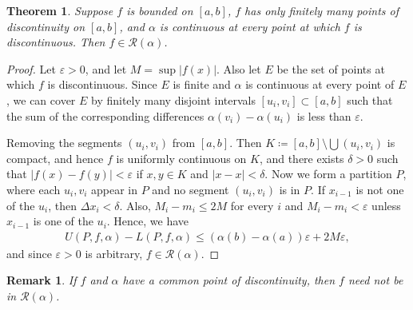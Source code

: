 \documentclass[11pt]{book}
\newtheorem{theorem}{Theorem}[chapter]
\newtheorem{remark}{Remark}[chapter]
\theoremstyle{definition}
\numberwithin{equation}{chapter}
\begin{document}
\begin{theorem}
Suppose $f$ is bounded on $[a,b]$, $f$ has only finitely many points of discontinuity on $[a,b]$, and $\alpha$ is continuous at every point at which $f$ is discontinuous. Then $f \in \mathscr{R}(\alpha)$.
\end{theorem}
\begin{proof}
Let $\varepsilon > 0$, and let $M = \sup \left|f(x)\right|$. Also let $E$ be the set of points at which $f$ is discontinuous. Since $E$ is finite and $\alpha$ is continuous at every point of $E$, we can cover $E$ by finitely many disjoint intervals $[u_i,v_i] \subset [a,b]$ such that the sum of the corresponding differences $\alpha(v_i) - \alpha(u_i)$ is less than $\varepsilon$. 

Removing the segments $(u_i,v_i)$ from $[a,b]$. Then $K \coloneqq [a,b] \setminus \bigcup (u_i,v_i)$ is compact, and hence $f$ is uniformly continuous on $K$, and there exists $\delta > 0$ such that $\left|f(x) - f(y)\right| < \varepsilon$ if $x,y \in K$ and $\left|x - x\right| < \delta$. Now we form a partition $P$, where each $u_i,v_i$ appear in $P$ and no segment $(u_i,v_i)$ is in $P$. If $x_{i-1}$ is not one of the $u_i$, then $\Delta x_i < \delta$. 
Also, $M_i - m_i \leq 2M$ for every $i$ and $M_i - m_i < \varepsilon$ unless $x_{i-1}$ is one of the $u_i$. Hence, we have
\begin{align*}
    U(P,f,\alpha) - L(P,f,\alpha) \leq \left(\alpha(b) - \alpha(a)\right) \varepsilon + 2M \varepsilon,
\end{align*}
and since $\varepsilon > 0$ is arbitrary, $f \in \mathscr{R}(\alpha)$.
\end{proof}

\begin{remark}
If $f$ and $\alpha$ have a common point of discontinuity, then $f$ need not be in $\mathscr{R}(\alpha)$.
\end{remark}

\medskip
\end{document}
